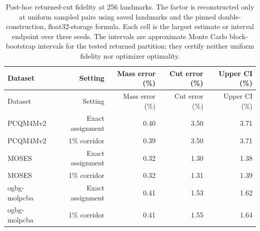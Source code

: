 \begin{longtable}{lrrrr}
\caption{Post-hoc returned-cut fidelity at 256 landmarks. The factor is reconstructed only at uniform sampled pairs using saved landmarks and the pinned double-construction, float32-storage formula. Each cell is the largest estimate or interval endpoint over three seeds. The intervals are approximate Monte Carlo block-bootstrap intervals for the tested returned partition; they certify neither uniform fidelity nor optimizer optimality.}\\
\toprule
Dataset & Setting & Mass error (\%) & Cut error (\%) & Upper CI (\%)\\\midrule
\endfirsthead
\toprule
Dataset & Setting & Mass error (\%) & Cut error (\%) & Upper CI (\%)\\\midrule
\endhead
\midrule\endfoot
\bottomrule\endlastfoot
PCQM4Mv2 & Exact assignment & 0.40 & 3.50 & 3.71\\
PCQM4Mv2 & 1\% corridor & 0.39 & 3.50 & 3.71\\
MOSES & Exact assignment & 0.32 & 1.30 & 1.38\\
MOSES & 1\% corridor & 0.32 & 1.31 & 1.39\\
ogbg-molpcba & Exact assignment & 0.41 & 1.53 & 1.62\\
ogbg-molpcba & 1\% corridor & 0.41 & 1.55 & 1.64\\
\end{longtable}
